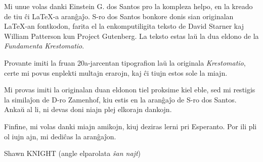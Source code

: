 \kolofono

Mi unue volas danki Einstein G. dos Santos pro la kompleza helpo, en la kreado de tiu ĉi \LaTeX{}-a aranĝaĵo.  S-ro dos Santos bonkore donis sian originalan \LaTeX{}-an fontkodon, farita el la enkomputiligita teksto de David Starner kaj William Patterson kun Project Gutenberg.  La teksto estas laŭ la dua eldono de la \emph{Fundamenta Krestomatio}.

Provante imiti la fruan 20a-jarcentan tipografion laŭ la originala \emph{Krestomatio}, certe mi povus enplekti multajn erarojn, kaj ĉi tiujn estos sole la miajn.

Mi provas imiti la originalan duan eldonon tiel proksime kiel eble, sed mi restigis la similaĵon de D-ro Zamenhof, kiu estis en la aranĝaĵo de S-ro dos Santos.  Ankaŭ al li, ni devas doni niajn plej elkorajn dankojn.

Finfine, mi volas danki miajn amikojn, kiuj deziras lerni pri Esperanto.  Por ili pli ol iujn ajn, mi dediĉas la aranĝaĵon.

\vspace{1em}

{\setlength{\parindent}{0em}
Shawn KNIGHT (angle elparolata \emph{ŝan najt})\\
\hodiau}


